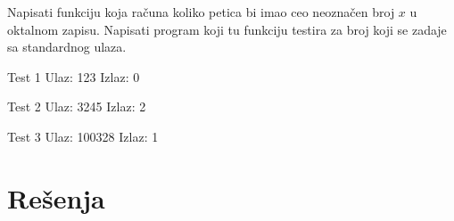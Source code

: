 \begin{Exercise}[label=212]
Napisati funkciju koja računa koliko petica bi imao ceo
  neoznačen broj $x$ u oktalnom zapisu. Napisati program koji
  tu funkciju testira za broj koji se zadaje sa standardnog ulaza.
  
\begin{minitest}
\begin{test}{Test 1}
Ulaz:   123        
Izlaz:  0             
\end{test}
\end{minitest}
\begin{minitest}
\begin{test}{Test 2}
Ulaz:   3245      
Izlaz:  2              
\end{test}
\end{minitest}
\begin{minitest}
\begin{test}{Test 3}
Ulaz:   100328
Izlaz:  1
\end{test}
\end{minitest}  
\end{Exercise}
\begin{Answer}[ref=212]
\end{Answer}


\section{Rešenja}
\shipoutAnswer
